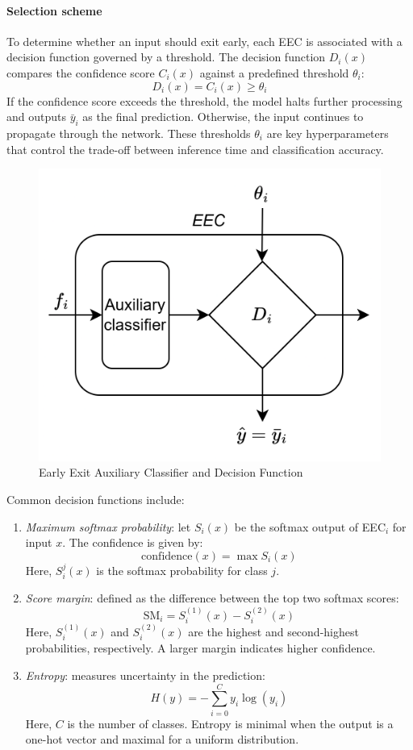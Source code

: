 \paragraph*{Selection scheme}
To determine whether an input should exit early, each EEC is associated with a decision function governed by a threshold.
The decision function $D_i(x)$ compares the confidence score $C_i (x)$  against a predefined threshold $\theta_i$: 
\[D_i(x) = C_i (x) \geq \theta_i\]
\noindent If the confidence score exceeds the threshold, the model halts further processing and outputs $\bar{y}_i$ as the final prediction.
Otherwise, the input continues to propagate through the network.
These thresholds $\theta_i$ are key hyperparameters that control the trade-off between inference time and classification accuracy.
\begin{figure}[H]
    \centering
    \includegraphics[width=0.4\linewidth]{images/eeai12.png}
    \caption{Early Exit Auxiliary Classifier and Decision Function}
\end{figure}
\noindent Common decision functions include:
\begin{enumerate}
    \item \textit{Maximum softmax probability}: let $S_i(x)$ be the softmax output of EEC$_i$ for input $x$. 
        The confidence is given by:
        \[\text{confidence}(x)=\max S_i(x)\]
        Here, $S_i^j(x)$ is the softmax probability for class $j$.
    \item \textit{Score margin}: defined as the difference between the top two softmax scores:
        \[\text{SM}_i=S_i^{(1)}(x)-S_i^{(2)}(x)\]
        Here, $S_i^{(1)}(x)$ and $S_i^{(2)}(x)$ are the highest and second-highest probabilities, respectively. 
        A larger margin indicates higher confidence.
    \item \textit{Entropy}: measures uncertainty in the prediction:
        \[H(y) = -\sum_{i=0}^C y_i\log(y_i)\]
        Here, $C$ is the number of classes. 
        Entropy is minimal when the output is a one-hot vector and maximal for a uniform distribution. 
\end{enumerate}

